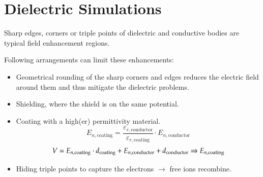\section{Dielectric Simulations}

Sharp edges, corners or triple points of dielectric and conductive bodies are typical field enhancement regions. \newline
\begin{minipage}[lt]{15cm}
	Following arrangements can limit these enhancements:
	\begin{itemize}
		\item Geometrical rounding of the sharp corners and edges reduces the electric field around them and thus mitigate the dielectric problems.
		\item Shielding, where the shield is on the same potential.
		\item Coating with a high(er) permittivity material. 
		\begin{equation*}
			E_{n,\textrm{coating}} = \frac{\varepsilon_{r,\textrm{conductor}}}{\varepsilon_{r,\textrm{coating}}} \cdot E_{n,\textrm{conductor}}
		\end{equation*}
		\begin{equation*}
			V = E_{n, \textrm{coating}} \cdot d_\textrm{coating} + E_{n,\textrm{conductor}} + d_\textrm{conductor}
			\vspace{2cm}
			\Rightarrow E_{n,\textrm{coating}} 
		\end{equation*}
		\item Hiding triple points to capture the electrons $\rightarrow$ free ions recombine.
	\end{itemize}
\end{minipage}
